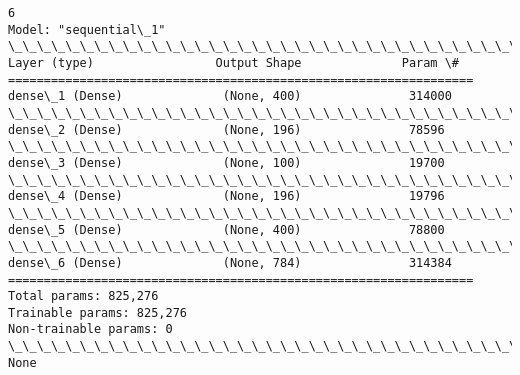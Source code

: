\documentclass[11pt]{article}
\begin{document}
    \begin{Verbatim}[commandchars=\\\{\}]
6
Model: "sequential\_1"
\_\_\_\_\_\_\_\_\_\_\_\_\_\_\_\_\_\_\_\_\_\_\_\_\_\_\_\_\_\_\_\_\_\_\_\_\_\_\_\_\_\_\_\_\_\_\_\_\_\_\_\_\_\_\_\_\_\_\_\_\_\_\_\_\_
Layer (type)                 Output Shape              Param \#
=================================================================
dense\_1 (Dense)              (None, 400)               314000
\_\_\_\_\_\_\_\_\_\_\_\_\_\_\_\_\_\_\_\_\_\_\_\_\_\_\_\_\_\_\_\_\_\_\_\_\_\_\_\_\_\_\_\_\_\_\_\_\_\_\_\_\_\_\_\_\_\_\_\_\_\_\_\_\_
dense\_2 (Dense)              (None, 196)               78596
\_\_\_\_\_\_\_\_\_\_\_\_\_\_\_\_\_\_\_\_\_\_\_\_\_\_\_\_\_\_\_\_\_\_\_\_\_\_\_\_\_\_\_\_\_\_\_\_\_\_\_\_\_\_\_\_\_\_\_\_\_\_\_\_\_
dense\_3 (Dense)              (None, 100)               19700
\_\_\_\_\_\_\_\_\_\_\_\_\_\_\_\_\_\_\_\_\_\_\_\_\_\_\_\_\_\_\_\_\_\_\_\_\_\_\_\_\_\_\_\_\_\_\_\_\_\_\_\_\_\_\_\_\_\_\_\_\_\_\_\_\_
dense\_4 (Dense)              (None, 196)               19796
\_\_\_\_\_\_\_\_\_\_\_\_\_\_\_\_\_\_\_\_\_\_\_\_\_\_\_\_\_\_\_\_\_\_\_\_\_\_\_\_\_\_\_\_\_\_\_\_\_\_\_\_\_\_\_\_\_\_\_\_\_\_\_\_\_
dense\_5 (Dense)              (None, 400)               78800
\_\_\_\_\_\_\_\_\_\_\_\_\_\_\_\_\_\_\_\_\_\_\_\_\_\_\_\_\_\_\_\_\_\_\_\_\_\_\_\_\_\_\_\_\_\_\_\_\_\_\_\_\_\_\_\_\_\_\_\_\_\_\_\_\_
dense\_6 (Dense)              (None, 784)               314384
=================================================================
Total params: 825,276
Trainable params: 825,276
Non-trainable params: 0
\_\_\_\_\_\_\_\_\_\_\_\_\_\_\_\_\_\_\_\_\_\_\_\_\_\_\_\_\_\_\_\_\_\_\_\_\_\_\_\_\_\_\_\_\_\_\_\_\_\_\_\_\_\_\_\_\_\_\_\_\_\_\_\_\_
None
\end{Verbatim}
\end{document}
